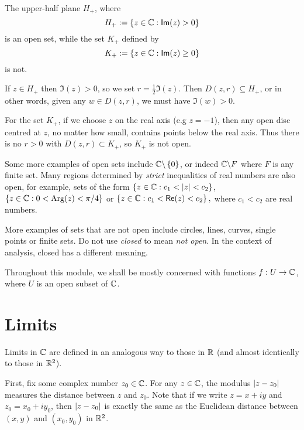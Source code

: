 \begin{example}
 The upper-half plane $H_+$, where
\[
H_+ := \left\{ z \in \mathbb{C}: \textsf{Im} (z) > 0 \right\}
\]
is an open set, while the set $K_+$ defined by
\[
K_+:= \left\{ z \in \mathbb{C} : \textsf{Im} (z) \geq 0 \right\}
\]
is not.
\begin{center}
 \quad {}
\end{center}
\begin{blankbox}
If $z \in H_+$ then $\Im (z)>0$, so we set $r = \frac{1}{2} \Im (z)$.  Then $D(z,r)\subseteq H_+$, or in other words, given any $w \in D(z,r)$, we must have $\Im(w)>0$.

For the set $K_+$, if we choose $z$ on the real axis (e.g $z=-1$), then any open disc centred at $z$, no matter how small, contains points below the real axis.  Thus there is no $r>0$ with $D(z,r) \subset K_+$, so $K_+$ is not open.
\end{blankbox}
\end{example}




\begin{note}
Some more examples of open sets include $\mathbb{C} \backslash \left\{0\right\}$, or indeed $\mathbb{C} \backslash F$ where $F$ is any finite set.  Many regions determined by \emph{strict} inequalities of real numbers are also open, for example, sets of the form
$
\left\{ z \in \mathbb{C}: c_1<\left| z \right|<c_2 \right\}$, $\left\{ z \in \mathbb{C}: 0 < \mathrm{Arg} (z) < \pi/4 \right\}$ or $\left\{z \in \mathbb{C}: c_1<\textsf{Re}(z) < c_2 \right\},$
where $c_1<c_2 $ are real numbers.

More examples of sets that are not open include circles, lines, curves, single points or finite sets.  Do not use \emph{closed} to mean \emph{not open}.  In the context of analysis, closed has a different meaning.
\end{note}
Throughout this module, we shall be mostly concerned with functions $f:U \to \mathbb{C}$, where $U$ is an open subset of $\mathbb{C}$.  

 
\section{Limits}
Limits in $\mathbb{C}$ are defined in an analogous way to those in $\mathbb{R}$ (and almost identically to those in $\mathbb{R}^2$). 

First, fix some complex number $z_0 \in \mathbb{C}$.  For any $z \in \mathbb{C}$, the modulus $\left| z-z_0 \right|$ measures the distance between $z$ and $z_0$.  Note that if we write $z=x+iy$ and $z_0=x_0+iy_0$, then $\left| z-z_0 \right|$ is exactly the same as the Euclidean distance between $(x,y)$ and $(x_0,y_0)$ in $\mathbb{R}^2$.




